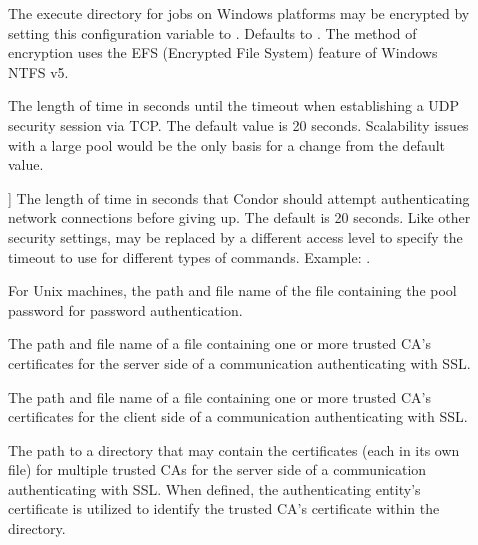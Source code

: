 \begin{description}
\item[]
\label{param:EncryptExecuteDirectory}
The execute directory for jobs on Windows platforms may be
encrypted by setting this configuration variable to .
Defaults to .
The method of encryption uses the EFS (Encrypted File System)
feature of Windows NTFS v5.

\item[]
\label{param:SecTCPSessionTimeout}
The length of time in seconds until the timeout
when establishing a UDP security session via TCP.
The default value is 20 seconds.
Scalability issues with a large pool would be the only basis
for a change from the default value.

\item[]
\label{param:SecDaemonAuthenticationTimeout}]
The length of time in seconds that Condor should attempt
authenticating network connections before giving up.  The default is
20 seconds.  Like other security settings,  may be
replaced by a different access level to specify the timeout to use for
different types of commands.  Example:
.

\item[]
\label{param:SecPasswordFile} For Unix machines, the path and file name
of  the file containing the pool password for password authentication.


\item[]
\label{param:AuthSSLServerCAFile}  The path and file name of
a file containing one or more trusted CA's certificates
for the server side of a communication authenticating 
with SSL.

\item[]
\label{param:AuthSSLClientCAFile} The path and file name of
a file containing one or more trusted CA's certificates
for the client side of a communication authenticating 
with SSL.


\item[]
\label{param:AuthSSLServerCADir}  
The path to a directory that may contain the 
certificates (each in its own file) for multiple trusted CAs 
for the server side of a communication authenticating 
with SSL.
When defined, the authenticating entity's certificate 
is utilized to identify the trusted CA's certificate
within the directory.


\end{description}
